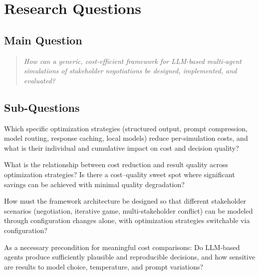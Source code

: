 \documentclass[12pt, a4paper]{article}
\begin{document}
\section{Research Questions}

\subsection*{Main Question}

\begin{quote}
    \textit{How can a generic, cost-efficient framework for LLM-based multi-agent simulations of stakeholder negotiations be designed, implemented, and evaluated?}
\end{quote}

\subsection*{Sub-Questions}

\begin{description}[style=nextline, leftmargin=1.5cm]
    \item[RQ1 (Cost Optimization: Core)] Which specific optimization strategies (structured output, prompt compression, model routing, response caching, local models) reduce per-simulation costs, and what is their individual and cumulative impact on cost and decision quality?

    \item[RQ2 (Cost-Quality Tradeoff)] What is the relationship between cost reduction and result quality across optimization strategies? Is there a cost--quality sweet spot where significant savings can be achieved with minimal quality degradation?

    \item[RQ3 (Architecture)] How must the framework architecture be designed so that different stakeholder scenarios (negotiation, iterative game, multi-stakeholder conflict) can be modeled through configuration changes alone, with optimization strategies switchable via configuration?

    \item[RQ4 (Validity \& Reproducibility)] As a necessary precondition for meaningful cost comparisons: Do LLM-based agents produce sufficiently plausible and reproducible decisions, and how sensitive are results to model choice, temperature, and prompt variations?
\end{description}
\end{document}
